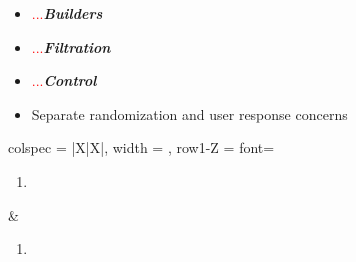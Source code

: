 \documentclass[7px]{article}
\begin{document}
\deploy
{
  \begin{itemize}
    \item[] \textcolor{red}{...}\textbf{\textsl{Builders}}
    \item[] \textcolor{red}{...}\textbf{\textsl{Filtration}}
    \item[] \textcolor{red}{...}\textbf{\textsl{Control}}
    \item Separate randomization and user response concerns
  \end{itemize}
}
{
 \raggedright
  \begin{tblr}{
      colspec = {|X|X|}, width = \linewidth,
      row{1-Z} = {font=\scriptsize}
    }
    { 
      \begin{enumerate}
        \item 
      \end{enumerate}
    } & {
      \begin{enumerate}
        \item
      \end{enumerate}
    } \\
  \end{tblr}
}
\end{document}
